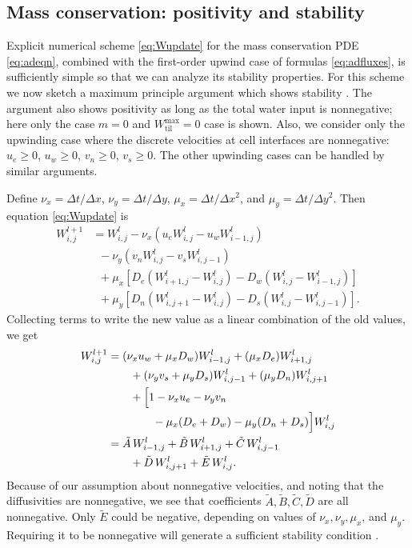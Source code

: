 \documentclass[gmd]{copernicus}   %
\newcommand{\text}{\textrm}
\newcommand{\Wtilmax}{W_{\text{til}}^{\text{max}}}
\newcommand{\Wlij}{W^l_{i,j}}
\begin{document}
\subsection{Mass conservation: positivity and stability}  Explicit numerical scheme \eqref{eq:Wupdate} for the mass conservation PDE \eqref{eq:adeqn}, combined with the first-order upwind case of formulas \eqref{eq:adfluxes}, is sufficiently simple so that we can analyze its stability properties.  For this scheme we now sketch a maximum principle argument which shows stability \citep{MortonMayers}.  The argument also shows positivity \citep{HundsdorferVerwer2010} as long as the total water input is nonnegative; here only the case $m = 0$ and $\Wtilmax=0$ case is shown.  Also, we consider only the upwinding case where the discrete velocities at cell interfaces are nonnegative: $u_e\ge 0$, $u_w\ge 0$, $v_n\ge 0$, $v_s\ge 0$.  The other upwinding cases can be handled by similar arguments.

Define $\nu_x = \Delta t/\Delta x$, $\nu_y = \Delta t/\Delta y$, $\mu_x = \Delta t/\Delta x^2$, and $\mu_y = \Delta t/\Delta y^2$.  Then equation \eqref{eq:Wupdate} is
\begin{align*}
 W_{i,j}^{l+1} &= \Wlij - \nu_x \left(u_e \Wlij - u_w W_{i-1,j}^l\right) \\
      &\;\; - \nu_y \left(v_n \Wlij - v_s W_{i,j-1}^l\right)  \\
      &\;\; + \mu_x \left[D_e \left(W_{i+1,j}^l - \Wlij\right) - D_w \left(\Wlij - W_{i-1,j}^l\right)\right]  \\
      &\;\; + \mu_y \left[D_n \left(W_{i,j+1}^l - \Wlij\right) - D_s \left(\Wlij - W_{i,j-1}^l\right)\right].
\end{align*}
Collecting terms to write the new value as a linear combination of the old values, we get
\begin{align}
 W_{i,j}^{l+1} &= (\nu_x u_w + \mu_x D_w) W_{i-1,j}^l + (\mu_x D_e) W_{i+1,j}^l \notag \\
      &\qquad + (\nu_y v_s + \mu_y D_s) W_{i,j-1}^l + (\mu_y D_n) W_{i,j+1}^l  \notag \\
      &\qquad + \Big[1 - \nu_x u_e - \nu_y v_n \notag \\
      &\qquad\qquad - \mu_x (D_e + D_w) - \mu_y (D_n + D_s)\Big] \Wlij \notag \\
  &= \tilde A\, W_{i-1,j}^l + \tilde B\, W_{i+1,j}^l + \tilde C\, W_{i,j-1}^l \notag \\
  &\qquad + \tilde D\, W_{i,j+1}^l + \tilde E\, \Wlij. \label{eq:lincomb}
\end{align}
Because of our assumption about nonnegative velocities, and noting that the diffusivities are nonnegative, we see that coefficients $\tilde A,\tilde B,\tilde C,\tilde D$ are all nonnegative.  Only $\tilde E$ could be negative, depending on values of $\nu_x, \nu_y, \mu_x$, and $\mu_y$.  Requiring it to be nonnegative will generate a sufficient stability condition \citep{MortonMayers}.
\end{document}
